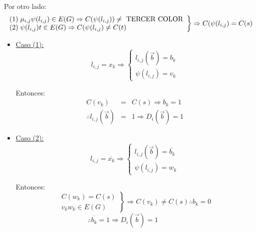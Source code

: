 \documentclass[12pt,a4paper]{report}
\newcounter{neq}
\begin{document}
  				\par Por otro lado:
  				\begin{equation*}
  		  		\left.
  		  		\begin{array}{l}
  		    	 	(1) \; \mu_{i, j} \psi(l_{i, j}) \in E(G) \Rightarrow C(\psi(l_{i, j})) \neq \textup{ TERCER COLOR} \\
  		    	 	(2) \; \psi(l_{i, j}) t \in E(G) \Rightarrow C(\psi(l_{i, j}) \neq C(t)
  		  		\end{array}
  		 		 	\right\rbrace
  		 			\Rightarrow C(\psi(l_{i, j}) = C(s)
  				\end{equation*}

  				\begin{itemize}
  					\item \underline{Caso (1):}
  						\begin{equation*}
  							l_{i, j} = x_{k} \Rightarrow
  		  					\left\lbrace
  							\begin{array}{l}
  	  		 					l_{i, j}(\overrightarrow{b}) = b_{k} \\
  								\psi(l_{i, j}) = v_{k}
  							\end{array}
  							\right.
  						\end{equation*}

  						\par Entonces:
  						\begin{eqnarray}
  							\nonumber C(v_{k}) &=& C(s) \Rightarrow b_{k} = 1 \\
  							\nonumber \therefore l_{i, j}(\overrightarrow{b}) &=& 1 \Rightarrow D_{i}(\overrightarrow{b}) = 1
  						\end{eqnarray}
  					\item \underline{Caso (2):}
  						\begin{equation*}
  							l_{i, j} = \overline{x_{k}} \Rightarrow
  		  					\left\lbrace
  							\begin{array}{l}
  	  		 					l_{i, j}(\overrightarrow{b}) = 	\overline{b_{k}} \\
  								\psi(l_{i, j}) = w_{k}
  							\end{array}
  							\right.
  						\end{equation*}

  						\par Entonces:
  						\begin{equation*}
  		  				\left.
  		  				\begin{array}{l}
  		    		 		C(w_{k}) = C(s) \\
  		    		 		v_{k} w_{k} \in E(G)
  		  				\end{array}
  		 			 		\right\rbrace
  		 			 		\Rightarrow C(v_{k}) \neq C(s) \therefore b_{k} = 0
  						\end{equation*}
  						$\qquad\qquad\qquad\qquad\qquad$
  						$\therefore \overline{b_{k}} = 1 \Rightarrow D_{i}(\overrightarrow{b}) = 1$
  				\end{itemize}
\end{document}

